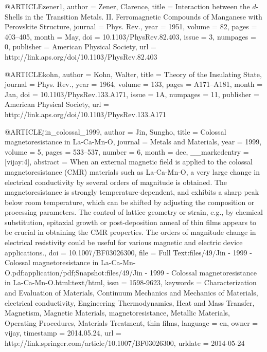 @ARTICLE{zener1,
  author = {Zener, Clarence},
  title = {Interaction between the $d$-Shells in the Transition Metals. II.
	Ferromagnetic Compounds of Manganese with Perovskite Structure},
  journal = {Phys. Rev.},
  year = {1951},
  volume = {82},
  pages = {403--405},
  month = {May},
  doi = {10.1103/PhysRev.82.403},
  issue = {3},
  numpages = {0},
  publisher = {American Physical Society},
  url = {http://link.aps.org/doi/10.1103/PhysRev.82.403}
}

@ARTICLE{kohn,
  author = {Kohn, Walter},
  title = {Theory of the Insulating State},
  journal = {Phys. Rev.},
  year = {1964},
  volume = {133},
  pages = {A171--A181},
  month = {Jan},
  doi = {10.1103/PhysRev.133.A171},
  issue = {1A},
  numpages = {11},
  publisher = {American Physical Society},
  url = {http://link.aps.org/doi/10.1103/PhysRev.133.A171}
}

@ARTICLE{jin_colossal_1999,
  author = {Jin, Sungho},
  title = {Colossal magnetoresistance in La-Ca-Mn-O},
  journal = {Metals and Materials},
  year = {1999},
  volume = {5},
  pages = {533--537},
  number = {6},
  month = dec,
  __markedentry = {[vijay:4]},
  abstract = {When an external magnetic field is applied to the colossal magnetoresistance
	({CMR)} materials such as La-Ca-Mn-O, a very large change in electrical
	conductivity by several orders of magnitude is obtained. The magnetoresistance
	is strongly temperature-dependent, and exhibits a sharp peak below
	room temperature, which can be shifted by adjusting the composition
	or processing parameters. The control of lattice geometry or strain,
	e.g., by chemical substitution, epitaxial growth or post-deposition
	anneal of thin films appears to be crucial in obtaining the {CMR}
	properties. The orders of magnitude change in electrical resistivity
	could be useful for various magnetic and electric device applications.},
  doi = {10.1007/BF03026300},
  file = {Full Text:files/49/Jin - 1999 - Colossal magnetoresistance in La-Ca-Mn-O.pdf:application/pdf;Snapshot:files/49/Jin - 1999 - Colossal magnetoresistance in La-Ca-Mn-O.html:text/html},
  issn = {1598-9623},
  keywords = {Characterization and Evaluation of Materials, Continuum Mechanics
	and Mechanics of Materials, electrical conductivity, Engineering
	Thermodynamics, Heat and Mass Transfer, Magnetism, Magnetic Materials,
	magnetoresistance, Metallic Materials, Operating Procedures, Materials
	Treatment, thin films},
  language = {en},
  owner = {vijay},
  timestamp = {2014.05.24},
  url = {http://link.springer.com/article/10.1007/BF03026300},
  urldate = {2014-05-24}
}

